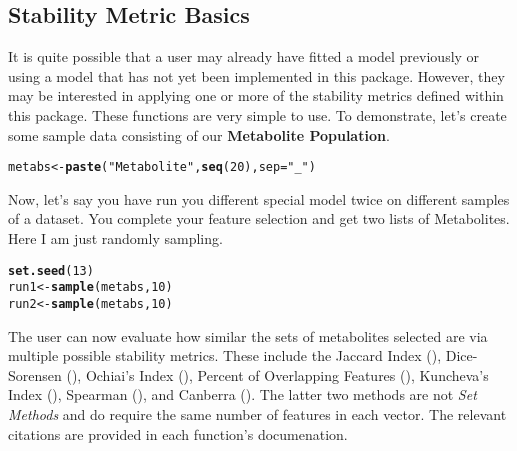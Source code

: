 \documentclass[12pt]{article}\usepackage[]{graphicx}\usepackage[usenames,dvipsnames]{color}
\makeatletter
\newcommand{\hlnum}[1]{\textcolor[rgb]{0.686,0.059,0.569}{#1}}%
\newcommand{\hlstr}[1]{\textcolor[rgb]{0.192,0.494,0.8}{#1}}%
\newcommand{\hlstd}[1]{\textcolor[rgb]{0.345,0.345,0.345}{#1}}%
\newcommand{\hlkwb}[1]{\textcolor[rgb]{0.69,0.353,0.396}{#1}}%
\newcommand{\hlkwc}[1]{\textcolor[rgb]{0.333,0.667,0.333}{#1}}%
\newcommand{\hlkwd}[1]{\textcolor[rgb]{0.737,0.353,0.396}{\textbf{#1}}}%
\newenvironment{kframe}{%
 \def\at@end@of@kframe{}%
 \ifinner\ifhmode%
  \def\at@end@of@kframe{\end{minipage}}%
  \begin{minipage}{\columnwidth}%
 \fi\fi%
 \def\FrameCommand##1{\hskip\@totalleftmargin \hskip-\fboxsep
 \colorbox{shadecolor}{##1}\hskip-\fboxsep
     \hskip-\linewidth \hskip-\@totalleftmargin \hskip\columnwidth}%
 \MakeFramed {\advance\hsize-\width
   \@totalleftmargin\z@ \linewidth\hsize
   \@setminipage}}%
 {\par\unskip\endMakeFramed%
 \at@end@of@kframe}
\newenvironment{knitrout}{}{} %
\makeatother
\begin{document}
\subsection{Stability Metric Basics}

It is quite possible that a user may already have fitted a model previously
or using a model that has not yet been implemented in this package.  However,
they may be interested in applying one or more of the stability metrics
defined within this package.  These functions are very simple to use.  To 
demonstrate, let's create some sample data consisting of our \textbf{Metabolite
Population}.

\begin{knitrout}
\color{fgcolor}\begin{kframe}
\begin{alltt}
\hlstd{metabs} \hlkwb{<-} \hlkwd{paste}\hlstd{(}\hlstr{"Metabolite"}\hlstd{,} \hlkwd{seq}\hlstd{(}\hlnum{20}\hlstd{),} \hlkwc{sep}\hlstd{=}\hlstr{"_"}\hlstd{)}
\end{alltt}
\end{kframe}
\end{knitrout}

Now, let's say you have run you different special model twice on different 
samples of a dataset.  You complete your feature selection and get two lists
of Metabolites.  Here I am just randomly sampling.

\begin{knitrout}
\color{fgcolor}\begin{kframe}
\begin{alltt}
\hlkwd{set.seed}\hlstd{(}\hlnum{13}\hlstd{)}
\hlstd{run1} \hlkwb{<-} \hlkwd{sample}\hlstd{(metabs,} \hlnum{10}\hlstd{)}
\hlstd{run2} \hlkwb{<-} \hlkwd{sample}\hlstd{(metabs,} \hlnum{10}\hlstd{)}
\end{alltt}
\end{kframe}
\end{knitrout}

The user can now evaluate how similar the sets of metabolites selected are via
multiple possible stability metrics.  These include the Jaccard Index 
(), Dice-Sorensen (), Ochiai's Index 
(), Percent of Overlapping Features (), 
Kuncheva's Index (), Spearman (), and
Canberra ().  The latter two methods are not 
\emph{Set Methods} and do require the same number of features in each vector.
The relevant citations are provided in each function's documenation.
\end{document}

